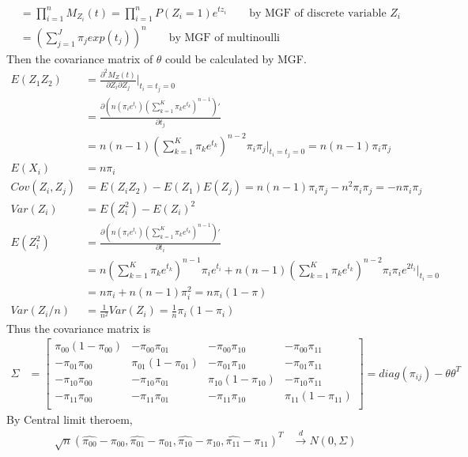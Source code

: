 \documentclass[11pt]{article} %
\begin{document}
\begin{itemize}
\begin{align*}
		&= \prod_{i=1}^n M_{Z_i}(t) = \prod_{i=1}^n P(Z_i= 1) e^{tz_i}\qquad  \text{by MGF of discrete variable $Z_i$}\\
		&= \left( \sum_{j=1}^J \pi_j exp(t_j)\right)^n \qquad \text{by MGF of multinoulli}
	\end{align*}  
	Then the covariance matrix of $\theta$ could be calculated by MGF.
	\begin{align*}
		E(Z_1 Z_2) &= \frac{\partial^2 M_Z(t)}{\partial Z_i \partial Z_j}|_{t_i = t_j = 0}\\
		&= \frac{\partial \left(n(\pi_ie^{t_i})(\sum_{k=1}^K \pi_ke^{t_k})^{n-1} \right)'}{\partial t_j}\\
		&= n(n-1)(\sum_{k=1}^K \pi_ke^{t_k})^{n-2}\pi_i\pi_j|_{t_i = t_j = 0} = n(n-1)\pi_i\pi_j\\
		E(X_i) &= n\pi_i\\
		Cov(Z_i, Z_j) &= E(Z_i Z_2) - E(Z_1)E(Z_j) = n(n-1)\pi_i\pi_j - n^2 \pi_i\pi_j = -n\pi_i\pi_j\\
		Var(Z_i) &= E(Z_i^2) - E(Z_i)^2 \\
		E(Z_i^2) &=  \frac{\partial \left(n(\pi_ie^{t_i})(\sum_{k=1}^K \pi_ke^{t_k})^{n-1} \right)'}{\partial t_i}\\
		&= n(\sum_{k=1}^K \pi_ke^{t_k})^{n-1}\pi_i e^{t_i}+ n(n-1)(\sum_{k=1}^K \pi_ke^{t_k})^{n-2}\pi_i\pi_i e^{2t_i}|_{t_i = 0} \\
		&= n\pi_i + n(n-1)\pi_i^2 = n\pi_i(1-\pi)\\
		Var(Z_i/n) &= \frac{1}{n^2} Var(Z_i) = \frac{1}{n}\pi_i(1-\pi_i)
	\end{align*}
	Thus the covariance matrix is
	\begin{align*}
		\Sigma &= \begin{bmatrix}
			\pi_{00}(1-\pi_{00}) &  -\pi_{00}\pi_{01}&  -\pi_{00}\pi_{10} &  -\pi_{00}\pi_{11}\\
			-\pi_{01}\pi_{00} & \pi_{01}(1-\pi_{01}) & -\pi_{01}\pi_{10}   & -\pi_{01}\pi_{11}  \\
			-\pi_{10}\pi_{00} & -\pi_{10}\pi_{01} &  \pi_{10}(1-\pi_{10})  & -\pi_{10}\pi_{11}  \\
			-\pi_{11}\pi_{00} &  -\pi_{11}\pi_{01} & -\pi_{11}\pi_{10}   & \pi_{11}(1-\pi_{11})  \\
		\end{bmatrix}= diag{(\pi_{ij}) - \theta \theta^T}
	\end{align*}
	By Central limit theroem, 
	\begin{align*}
		\sqrt{n} (\hat{\pi_{00}} - \pi_{00}, \hat{\pi_{01}}- \pi_{01}, \hat{\pi_{10}} - \pi_{10}, \hat{\pi_{11}}- \pi_{11} )^T & \xrightarrow[]{d} N(0, \Sigma)

\end{align*}
\end{itemize}
\end{document}
